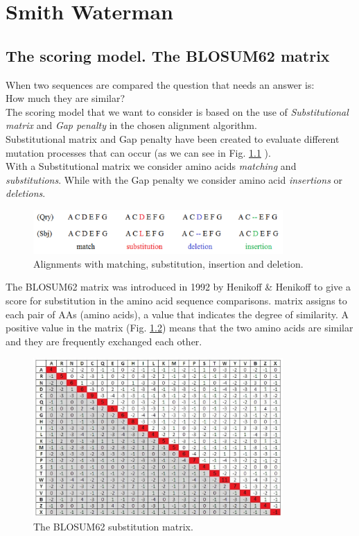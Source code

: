 \chapter{Smith Waterman}
\section{The scoring model. The BLOSUM62 matrix}
When two sequences are compared the question that needs an answer is:\\How much they are similar?\\
 The scoring model that we want to consider is based on the use of\textit{ Substitutional matrix} and \textit{Gap penalty} in the chosen alignment algorithm.\\Substitutional matrix and Gap penalty have been created to evaluate different mutation processes that can occur (as we can see in Fig. \ref{sw1} ).\\ 
 With a Substitutional matrix we consider amino acids \textit{matching} and \textit{substitutions}. While with the Gap penalty we consider amino acid \textit{insertions} or \textit{deletions}.
               \begin{figure}[h!]
               	\centering
               	\includegraphics[width=0.85\textwidth]{imm/sw/sw1.png} 	\caption{Alignments with matching, substitution, insertion and deletion.
               		} 
               	\label{sw1}
               \end{figure}
 
 
 
 The BLOSUM62 matrix was introduced in 1992 by Henikoff \& Henikoff \cite{sw-blosum} to give a score for substitution in the amino acid sequence comparisons.
  matrix assigns to each pair of AAs (amino acids), a value that indicates the degree of similarity.
 A positive value in the matrix (Fig. \ref{blosum62}) means that the two amino acids are similar and they are frequently exchanged each other. 
\begin{figure}[h!]
     	\centering
     	\includegraphics[width=0.85\textwidth]{imm/sw/blosum62.png} 	\caption{The BLOSUM62 substitution matrix.} 
     	\label{blosum62}
\end{figure}
\clearpage
